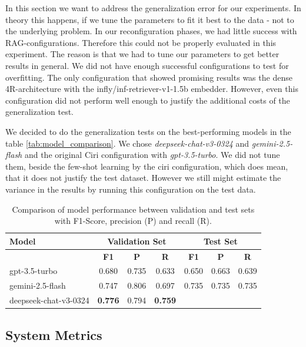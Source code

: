 In this section we want to address the generalization error for our experiments. In theory this happens, if we tune the parameters to fit it best to the data - not to the underlying problem. In our reconfiguration phases, we had little success with RAG-configurations. Therefore this could not be properly evaluated in this experiment. The reason is that we had to tune our parameters to get better results in general. We did not have enough successful configurations to test for overfitting. The only configuration that showed promising results was the dense 4R-architecture with the infly/inf-retriever-v1-1.5b embedder. However, even this configuration did not perform well enough to justify the additional costs of the generalization test. 

We decided to do the generalization tests on the best-performing models in the table \ref{tab:model_comparison}. We chose \textit{deepseek-chat-v3-0324} and \textit{gemini-2.5-flash} and the original Ciri configuration with \textit{gpt-3.5-turbo}. We did not tune them, beside the few-shot learning by the ciri configuration, which does mean, that it does not justify the test dataset. However we still might estimate the variance in the results by running this configuration on the test data.

\begin{table}[h]
    \centering
    \begin{tabular}{|l|c|c|c|c|c|c|}
        \hline
        \textbf{Model} & \multicolumn{3}{c|}{\textbf{Validation Set}} & \multicolumn{3}{c|}{\textbf{Test Set}} \\
        \hline
        & \textbf{F1} & \textbf{P} & \textbf{R} & \textbf{F1} &  \textbf{P} & \textbf{R} \\
        \hline
        gpt-3.5-turbo          & 0.680 & 0.735 & 0.633 & 0.650 & 0.663 & 0.639 \\
        gemini-2.5-flash       & 0.747 & 0.806 & 0.697 & 0.735 & 0.735 & 0.735 \\
        deepseek-chat-v3-0324  & \textbf{0.776} & 0.794 & \textbf{0.759} &  &  & \\
        \hline
    \end{tabular}
    \caption{Comparison of model performance between validation and test sets with F1-Score, precision (P) and recall (R).}
    \label{tab:generalization_comparison}
\end{table}



\subsection{System Metrics}

